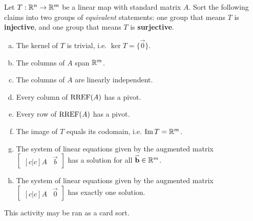 \begin{fact}
\begin{center}
\end{center}
\end{fact}

\begin{activity}{15}
Let \(T: \mathbb{R}^n \rightarrow \mathbb{R}^m\) be a linear map with standard matrix \(A\).
Sort the following claims into two groups of \textit{equivalent} statements:
one group that means \(T\) is \textbf{injective}, and one group that means
\(T\) is \textbf{surjective}.
\begin{multicols}{2}
\begin{enumerate}[(a)]
\item The kernel of \(T\) is trivial, i.e. \(\ker T=\{\vec 0\}\).
\item The columns of \(A\) span \(\mathbb{R}^m\).
\item The columns of \(A\) are linearly independent.
\item Every column of \(\operatorname{RREF}(A)\) has a pivot.
\item Every row of \(\operatorname{RREF}(A)\) has a pivot.
\item The image of \(T\) equals its codomain, i.e. \(\operatorname{Im} T=\mathbb{R}^m\).
\item The system of linear equations given by the augmented matrix \(\begin{bmatrix}[c|c]A & \vec{b} \end{bmatrix}\) has a solution for all \(\mathbf{\accentset{\rightharpoonup}{b}} \in \mathbb{R}^m\).
\item The system of linear equations given by the augmented matrix \(\begin{bmatrix}[c|c] A & \vec{0} \end{bmatrix}\) has exactly one solution.
\end{enumerate}
\end{multicols}
\begin{instructorNote}
  This activity may be ran as a card sort.
\end{instructorNote}
\end{activity}

